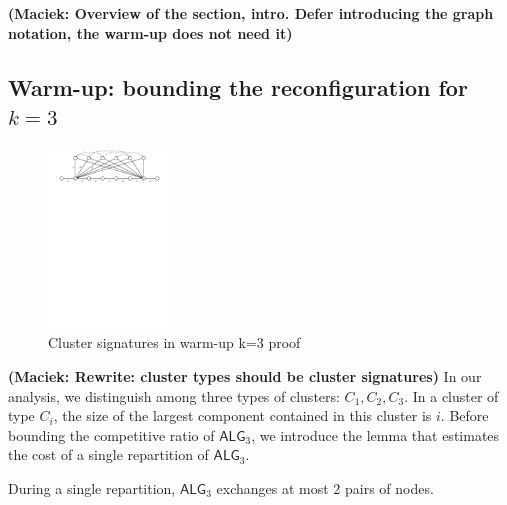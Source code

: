 \documentclass[manuscript,screen=true, review, anonymous]{acmart}
\newcommand{\TAlg}{{\ensuremath{\textsf{ALG}_{3}}}\xspace}
\newcommand\maciek[1]{\color{brown}\textbf{(Maciek: #1)}\color{black}}
\begin{document}
\maciek{Overview of the section, intro. Defer introducing the graph notation, the warm-up does not need it}

\subsection{Warm-up: bounding the reconfiguration for $k=3$}


\begin{figure}[H]
	\centering
	\includegraphics[width=0.3\textwidth]{figs/substitute}
	\caption{Cluster signatures in warm-up k=3 proof}
\end{figure}

\maciek{Rewrite: cluster types should be cluster signatures}
In our analysis, we distinguish among three types of clusters: $C_1, C_2, C_3$. In a cluster of type $C_i$, the size of the largest component contained in this cluster is $i$.
Before bounding the competitive ratio of \TAlg, we introduce the lemma that estimates the cost of a single repartition of \TAlg.

\begin{lemma}
	\label{lem:1req}
	During a single repartition, \TAlg exchanges at most $2$ pairs of nodes.
\end{lemma}
\end{document}
